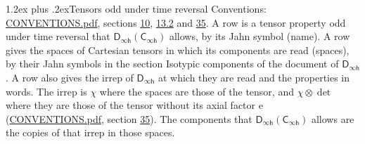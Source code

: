 \documentclass[10pt,a4paper]{article}
\makeatletter
\renewcommand\section{\@startsection{section}{1}{\z@}{-3ex plus -1ex minus -.2ex}%
  {1.2ex plus .2ex}{\normalfont\large\sffamily\bfseries\color{parttitle}}}
\numberwithin{equation}{section}
\newcommand{\grp}[1]{\mathsf{#1}}
\newcommand{\irrprod}{\otimes}
\makeatother
\begin{document}
\section{Tensors odd under time reversal}\label{s:time_odd}
Conventions: \href{../../CONVENTIONS.pdf}{CONVENTIONS.pdf}, sections \href{../../../rotation/CONVENTIONS.pdf\#conv.10}{10}, \href{../../../rotation/CONVENTIONS.pdf\#conv.13.2}{13.2} and \href{../../CONVENTIONS.pdf\#conv.35}{35}.
\leavevmode\label{n:head.name.property}A row is a tensor property odd under time reversal that $\grp{D_{\infty h}}(\grp{C_{\infty h}})$ allows, by its Jahn symbol (name). \label{n:head.spaces}A row gives the spaces of Cartesian tensors in which its components are read (spaces), by their Jahn symbols in the section Isotypic components of the document of \href{../../../rotation/data/pdf/Dinfh.pdf}{$\grp{D_{\infty h}}$}. \label{n:head.irrep}\label{n:head.properties}A row also gives the irrep of $\grp{D_{\infty h}}$ at which they are read and the properties in words. The irrep is $\chi$ where the spaces are those of the tensor, and $\chi \irrprod \det$ where they are those of the tensor without its axial factor e (\href{../../CONVENTIONS.pdf}{CONVENTIONS.pdf}, section \href{../../CONVENTIONS.pdf\#conv.35}{35}). The components that $\grp{D_{\infty h}}(\grp{C_{\infty h}})$ allows are the copies of that irrep in those spaces.
\end{document}

